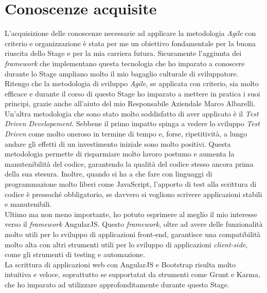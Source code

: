 \section{Conoscenze acquisite}
L'acquisizione delle conoscenze necessarie ad applicare la metodologia \emph{Agile} con criterio e organizzazione è stata per me un obiettivo fondamentale per la buona riuscita dello Stage e per la mia carriera futura. Sicuramente l'aggiunta dei \emph{framework} che implementano questa tecnologia che ho imparato a conoscere durante lo Stage ampliano molto il mio bagaglio culturale di sviluppatore.\\
Ritengo che la metodologia di sviluppo \emph{Agile}, se applicata con criterio, sia molto efficace e durante il corso di questo Stage ho imparato a mettere in pratica i suoi principi, grazie anche all'aiuto del mio Responsabile Aziendale Marco Albarelli.\\
Un'altra metodologia che sono stato molto soddisfatto di aver applicato è il \emph{Test Driven Developement}. Sebbene il primo impatto spinga a vedere lo sviluppo \emph{Test Driven} come molto oneroso in termine di tempo e, forse, ripetitività, a lungo andare gli effetti di un investimento iniziale sono molto positivi. Questa metodologia permette di risparmiare molto lavoro postumo e aumenta la manutenibilità del codice, garantendo la qualità del codice stesso ancora prima della sua stesura. Inoltre, quando si ha a che fare con linguaggi di programmazione molto liberi come JavaScript, l'apporto di test alla scrittura di codice è pressoché obbligatorio, se davvero si vogliono scrivere applicazioni stabili e manutenibili.\\
Ultimo ma non meno importante, ho potuto esprimere al meglio il mio interesse verso il \emph{framework} AngularJS. Questo \emph{framework}, oltre ad avere delle funzionalità molto utili per lo sviluppo di applicazioni \gls{front-end}, garantisce una compatibilità molto alta con altri strumenti utili per lo sviluppo di applicazioni \emph{client-side}, come gli strumenti di testing e automazione.\\
La scrittura di applicazioni web con AngularJS e Bootstrap risulta molto intuitiva e veloce, soprattutto se supportatat da strumenti come Grunt e Karma, che ho imparato ad utilizzare approfonditamente durante questo Stage. 

